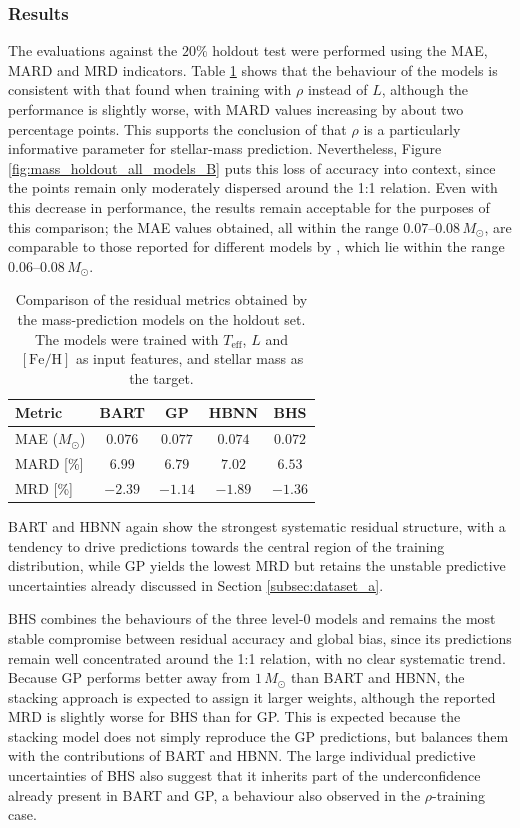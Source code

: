 \subsubsection*{Results}
The evaluations against the $20\%$ holdout test were performed using the MAE, MARD and MRD indicators. Table \ref{tab:dataset_b_mard_mrd} shows that the behaviour of the models is consistent with that found when training with $\rho$ instead of $L$, although the performance is slightly worse, with MARD values increasing by about two percentage points. This supports the conclusion of \citet{moya2018} that $\rho$ is a particularly informative parameter for stellar-mass prediction. Nevertheless, Figure \ref{fig:mass_holdout_all_models_B} puts this loss of accuracy into context, since the points remain only moderately dispersed around the 1:1 relation. Even with this decrease in performance, the results remain acceptable for the purposes of this comparison; the MAE values obtained, all within the range $0.07$--$0.08\,M_\odot$, are comparable to those reported for different models by \citet{moya2022}, which lie within the range $0.06$--$0.08\,M_\odot$.

\begin{table}[H]
\centering
\caption{Comparison of the residual metrics obtained by the mass-prediction models on the holdout set. The models were trained with $T_{\mathrm{eff}}$, $L$ and $[\mathrm{Fe}/\mathrm{H}]$ as input features, and stellar mass as the target.}
\label{tab:dataset_b_mard_mrd}
\begin{tabular}{lcccc}
\hline\hline
Metric & BART & GP & HBNN & BHS \\
\hline
MAE ($M_\odot$) & $0.076$ & $0.077$ & $0.074$ & $0.072$ \\
MARD [\%] & $6.99$ & $6.79$ & $7.02$ & $6.53$ \\
MRD [\%]  & $-2.39$ & $-1.14$ & $-1.89$ & $-1.36$ \\
\hline
\end{tabular}
\end{table}

BART and HBNN again show the strongest systematic residual structure, with a tendency to drive predictions towards the central region of the training distribution, while GP yields the lowest MRD but retains the unstable predictive uncertainties already discussed in Section \ref{subsec:dataset_a}.

BHS combines the behaviours of the three level-0 models and remains the most stable compromise between residual accuracy and global bias, since its predictions remain well concentrated around the 1:1 relation, with no clear systematic trend. Because GP performs better away from $1\,M_\odot$ than BART and HBNN, the stacking approach is expected to assign it larger weights, although the reported MRD is slightly worse for BHS than for GP. This is expected because the stacking model does not simply reproduce the GP predictions, but balances them with the contributions of BART and HBNN. The large individual predictive uncertainties of BHS also suggest that it inherits part of the underconfidence already present in BART and GP, a behaviour also observed in the $\rho$-training case.

